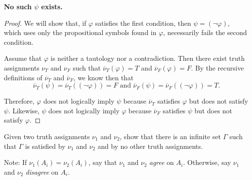 \documentclass[12pt]{article}
\newenvironment{exercise}[2][Exercise]{\begin{trivlist}
\item[\hskip \labelsep {\bfseries #1}\hskip \labelsep {\bfseries #2.}]}{\end{trivlist}}
\begin{document}
\noindent \textbf{No such $\psi$ exists.}

\begin{proof}

We will show that, if $\varphi$ satisfies the first condition, then $\psi = (\neg \varphi)$, which uses only the propositional symbols found in $\varphi$, necessarily fails the second condition.

Assume that $\varphi$ is neither a tautology nor a contradiction.  Then there exist truth assignments $\nu_T$ and $\nu_F$ such that $\overline{\nu}_T(\varphi)=T$ and $\overline{\nu}_F(\varphi) = F$.  By the recursive definitions of $\overline{\nu}_T$ and $\overline{\nu}_F$, we know then that $$\overline{\nu}_T (\psi) = \overline{\nu}_T ((\neg \varphi)) = F \textrm{ and } \overline{\nu}_F (\psi) = \overline{\nu}_F ((\neg \varphi)) = T.$$

Therefore, $\varphi$ does not logically imply $\psi$ because $\overline{\nu}_T$ satisfies $\varphi$ but does not satisfy $\psi$.  Likewise, $\psi$ does not logically imply $\varphi$ because $\overline{\nu}_F$ satisfies $\psi$ but does not satisfy $\varphi$.

\end{proof}

\begin{exercise}{2}

Given two truth assignments $\nu_1$ and $\nu_2$, show that there is an infinite set $\Gamma$ such that $\Gamma$ is satisfied by $\nu_1$ and $\nu_2$ and by no other truth assignments.

\end{exercise}

Note: If $\nu_1(A_i) = \nu_2(A_i)$, say that $\nu_1$ and $\nu_2$ \emph{agree} on $A_i$.  Otherwise, say $\nu_1$ and $\nu_2$ \emph{disagree} on $A_i$.
\end{document}
